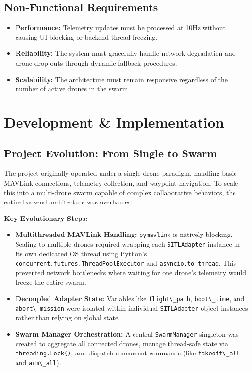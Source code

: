 \documentclass[11pt,a4paper]{article}
\newcommand{\code}[1]{\lstinline[basicstyle=\ttfamily\small,columns=fullflexible]|#1|}
\begin{document}
\subsection{Non-Functional Requirements}
\begin{itemize}[leftmargin=1.5em]
    \item \textbf{Performance:} Telemetry updates must be processed at 10Hz without causing UI blocking or backend thread freezing.
    \item \textbf{Reliability:} The system must gracefully handle network degradation and drone drop-outs through dynamic fallback procedures.
    \item \textbf{Scalability:} The architecture must remain responsive regardless of the number of active drones in the swarm.
\end{itemize}

\section{Development \& Implementation}

\subsection{Project Evolution: From Single to Swarm}
The project originally operated under a single-drone paradigm, handling basic MAVLink connections, telemetry collection, and waypoint navigation. To scale this into a multi-drone swarm capable of complex collaborative behaviors, the entire backend architecture was overhauled.

\textbf{Key Evolutionary Steps:}
\begin{itemize}[leftmargin=1.5em]
    \item \textbf{Multithreaded MAVLink Handling:} \code{pymavlink} is natively blocking. Scaling to multiple drones required wrapping each \code{SITLAdapter} instance in its own dedicated OS thread using Python's \code{concurrent.futures.ThreadPoolExecutor} and \code{asyncio.to_thread}. This prevented network bottlenecks where waiting for one drone's telemetry would freeze the entire swarm.
    \item \textbf{Decoupled Adapter State:} Variables like \code{flight\_path}, \code{boot\_time}, and \code{abort\_mission} were isolated within individual \code{SITLAdapter} object instances rather than relying on global state.
    \item \textbf{Swarm Manager Orchestration:} A central \code{SwarmManager} singleton was created to aggregate all connected drones, manage thread-safe state via \code{threading.Lock()}, and dispatch concurrent commands (like \code{takeoff\_all} and \code{arm\_all}).
\end{itemize}
\end{document}
